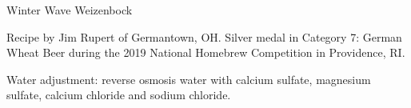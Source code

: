 \begin{recipe}{Winter Wave Weizenbock} %

\begin{aboutblock}
Recipe by Jim Rupert of Germantown, OH. Silver medal in Category 7: German
Wheat Beer during the 2019 National Homebrew Competition in Providence, RI.
\sourceaha
\end{aboutblock}


\begin{methodandtiming}
 
\begin{mashsteps}
\end{mashsteps}

\begin{directions}
Water adjustment: reverse osmosis water with  calcium sulfate,
 magnesium sulfate,  calcium chloride and 
sodium chloride.
\end{directions}

\end{methodandtiming}

\recipebreak

\begin{ingredientsblock}

\begin{malts}
\end{malts}

\begin{hops}
\end{hops}


\end{ingredientsblock}

\end{recipe}

